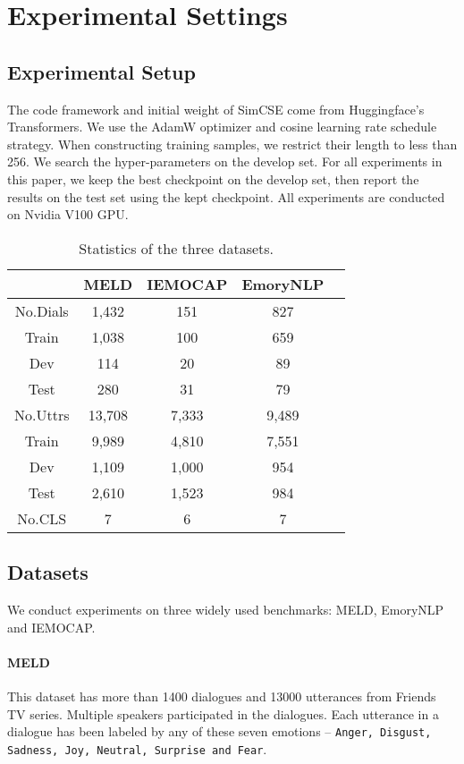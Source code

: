 \documentclass[11pt]{article}
\begin{document}
\section{Experimental Settings}

\subsection{Experimental Setup}
The code framework and initial weight of SimCSE come from Huggingface’s Transformers\cite{wolf2020transformers}. We use the AdamW optimizer and cosine learning rate schedule strategy. When constructing training samples, we restrict their length to less than 256. We search the hyper-parameters on the develop set. For all experiments in this paper, we keep the best checkpoint on the develop set,  then report the results on the test set using the kept checkpoint. All experiments are conducted on Nvidia V100 GPU.
\begin{table}[t]
    \centering
\begin{tabular}{c|cccc}
\hline  & MELD & IEMOCAP & EmoryNLP \\
\hline No.Dials & 1,432 & 151 & 827 \\
Train  & 1,038 & 100 & 659 \\
Dev & 114 & 20 & 89 \\
Test  & 280 & 31 & 79 \\
\hline No.Uttrs  & 13,708 & 7,333 & 9,489 \\
Train  & 9,989 & 4,810 & 7,551 \\
Dev  & 1,109 & 1,000 & 954 \\
Test  & 2,610 & 1,523 & 984 \\
\hline
No.CLS & 7 & 6 & 7 \\
\hline
\end{tabular}
    \caption{Statistics of the three datasets.}
    \label{tab:my_label}
\end{table}

\subsection{Datasets}

We conduct experiments on three widely used benchmarks: MELD\cite{poria2019meld}, EmoryNLP\cite{zahiri2018emotion} and IEMOCAP\cite{busso2008iemocap}.
    

\paragraph{MELD}  This dataset has more than 1400 dialogues and 13000 utterances from Friends TV series. Multiple speakers participated in the dialogues. Each utterance in a dialogue has been labeled by any of these seven emotions -- \texttt{Anger, Disgust, Sadness, Joy, Neutral, Surprise and Fear}. 
\end{document}
